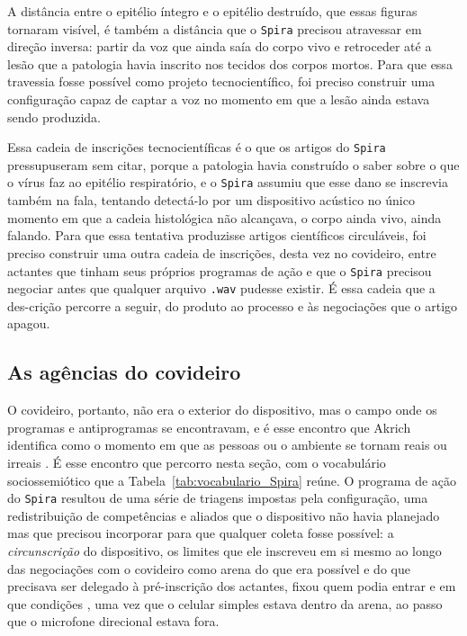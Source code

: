 A distância entre o epitélio íntegro e o epitélio destruído, que essas figuras tornaram visível, é também a distância que o \texttt{Spira} precisou atravessar em direção inversa: partir da voz que ainda saía do corpo vivo e retroceder até a lesão que a patologia havia inscrito nos tecidos dos corpos mortos. Para que essa travessia fosse possível como projeto tecnocientífico, foi preciso construir uma configuração capaz de captar a voz no momento em que a lesão ainda estava sendo produzida.

Essa cadeia de inscrições tecnocientíficas é o que os artigos do \texttt{Spira} pressupuseram sem citar, porque a patologia havia construído o saber sobre o que o vírus faz ao epitélio respiratório, e o \texttt{Spira} assumiu que esse dano se inscrevia também na fala, tentando detectá-lo por um dispositivo acústico no único momento em que a cadeia histológica não alcançava, o corpo ainda vivo, ainda falando. Para que essa tentativa produzisse artigos científicos circuláveis, foi preciso construir uma outra cadeia de inscrições, desta vez no covideiro, entre actantes que tinham seus próprios programas de ação e que o \texttt{Spira} precisou negociar antes que qualquer arquivo \texttt{.wav} pudesse existir. É essa cadeia que a des-crição percorre a seguir, do produto ao processo e às negociações que o artigo apagou.

\subsection{As agências do covideiro}
\label{subsec:configuracao_covideiro}

O covideiro, portanto, não era o exterior do dispositivo, mas o campo onde os programas e antiprogramas se encontravam, e é esse encontro que Akrich identifica como o momento em que as pessoas ou o ambiente se tornam reais ou irreais \parencite{Akrich1992Description}. É esse encontro que percorro nesta seção, com o vocabulário sociossemiótico que a Tabela~\ref{tab:vocabulario_Spira} reúne. O programa de ação do \texttt{Spira} resultou de uma série de triagens impostas pela configuração, uma redistribuição de competências e aliados que o dispositivo não havia planejado mas que precisou incorporar para que qualquer coleta fosse possível: a \textit{circunscrição} do dispositivo, os limites que ele inscreveu em si mesmo ao longo das negociações com o covideiro como arena do que era possível e do que precisava ser delegado à pré-inscrição dos actantes, fixou quem podia entrar e em que condições \parencite{AkrichLatour1992Convenient}, uma vez que o celular simples estava dentro da arena, ao passo que o microfone direcional estava fora.

